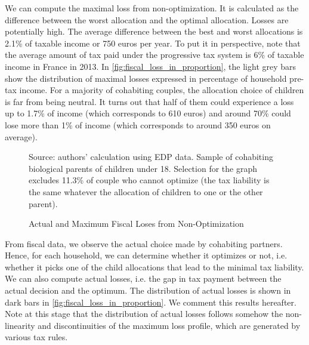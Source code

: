 We can compute the maximal loss from non-optimization. It is calculated as the difference between the worst allocation and the optimal allocation. Losses are potentially high. The average difference between the best and worst allocations is 2.1\% of taxable income or 750 euros per year. To put it in perspective, note that the average amount of tax paid under the progressive tax system is 6\% of taxable income in France in 2013. In \autoref{fig:fiscal_loss_in_proportion}, 
the light grey bars show the distribution of maximal losses expressed in percentage of household pre-tax income. For a majority of cohabiting couples, the allocation choice of children is far from being neutral. It turns out that half of them could experience a loss up to 1.7\% of income (which corresponds to 610 euros) and around 70\% could lose more than 1\% of income (which corresponds to around 350 euros on average).

  \begin{figure}[H]
    \caption{Actual and Maximum Fiscal Loses from Non-Optimization}
    \label{fig:fiscal_loss_in_proportion}
    {\small
    Source: authors’ calculation using EDP data. Sample of cohabiting biological parents of children under 18. Selection for the graph excludes 11.3\% of couple who cannot optimize (the tax liability is the same whatever the allocation of children to one or the other parent).}
  \end{figure}


From fiscal data, we observe the actual choice made by cohabiting partners. Hence, for each household, we can determine whether it optimizes or not, i.e. whether it picks one of the child allocations that lead to the minimal tax liability. We can also compute actual losses, i.e. the gap in tax payment between the actual decision and the optimum. The distribution of actual losses is shown in dark bars in \autoref{fig:fiscal_loss_in_proportion}. We comment this results hereafter. Note at this stage that the distribution of actual losses follows somehow the non-linearity and discontinuities of the maximum loss profile, which are generated by various tax rules.


